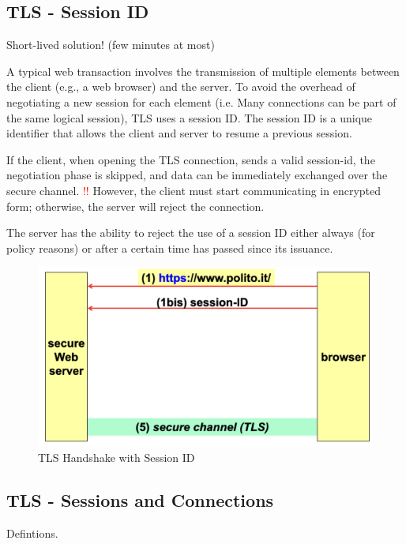 \subsection{TLS - Session ID}
\begin{center}
    Short-lived solution! (few minutes at most)
\end{center}
A typical web transaction involves the transmission of multiple elements between the client (e.g., a web browser) and the server. To avoid the overhead of negotiating a new session for each element (i.e. Many connections can be part of the same logical session), TLS uses a session ID. The session ID is a unique identifier that allows the client and server to resume a previous session.

If the client, when opening the TLS connection, sends a valid session-id, the negotiation phase is skipped, and data can be immediately exchanged over the secure channel. \textcolor{Red}{!!} However, the client must start communicating in encrypted form; otherwise, the server will reject the connection.

\begin{tcolorbox}[colback=red!10!white, colframe=red!70!black, coltitle=white, title=Beware]
    The server has the ability to reject the use of a session ID either always (for policy reasons) or after a certain time has passed since its issuance.
\end{tcolorbox}

\begin{figure}[H]
    \centering
    \includegraphics[width=0.6\linewidth]{Images/Appsec/handshake_tls_sess.png}
    \caption{TLS Handshake with Session ID}
\end{figure}

\subsection{TLS - Sessions and Connections}
\begin{center}
    Defintions.
\end{center}




